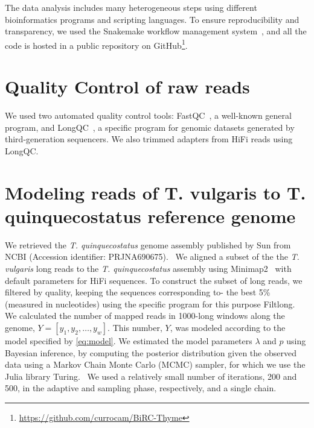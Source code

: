 The data analysis includes many heterogeneous steps using different bioinformatics programs and scripting languages. To ensure reproducibility and transparency, we used the Snakemake workflow management system~\cite{molderSustainableDataAnalysis2021}, and all the code is hosted in a public repository on GitHub\footnote{ \url{https://github.com/currocam/BiRC-Thyme}}.

\section{Quality Control of raw reads}


We used two automated quality control tools: FastQC~\cite{BabrahamBioinformaticsFastQC}, a well-known general program, and LongQC~\cite{fukasawaLongQCQualityControl2020}, a specific program for genomic datasets generated by third-generation sequencers. We also trimmed adapters from \ac{HiFi} reads using LongQC. ~\cite{fukasawaLongQCQualityControl2020}

\section{Modeling reads of T. vulgaris to T. quinquecostatus reference genome}

We retrieved the \textit{T. quinquecostatus} genome assembly published by Sun \etal from NCBI (Accession identifier: PRJNA690675).~\cite{sunChromosomelevelAssemblyAnalysis2022} We aligned a subset of the the \textit{T. vulgaris} long reads to the \textit{T. quinquecostatus} assembly using Minimap2~\cite{liMinimap2PairwiseAlignment2018} with default parameters for \ac{HiFi} sequences. To construct the subset of long reads, we filtered by quality, keeping the sequences corresponding to- the best 5\% (measured in nucleotides) using the specific program for this purpose Filtlong.~\cite{wickRrwickFiltlong2023}\\



We calculated the number of mapped reads in 1000-long windows along the genome, $Y = [ y_1, y_2, \dots, y_w]$. This number, $Y$, was modeled according to the model specified by \eqref{eq:model}. We estimated the model parameters $\lambda$ and $p$ using Bayesian inference, by computing the posterior distribution given the observed data using a Markov Chain Monte Carlo (\ac{MCMC}) sampler, for which we use the Julia library Turing.~\cite{DBLP:conf/aistats/GeXG18} We used a relatively small number of iterations, 200 and 500, in the adaptive and sampling phase, respectively, and a single chain. \\

